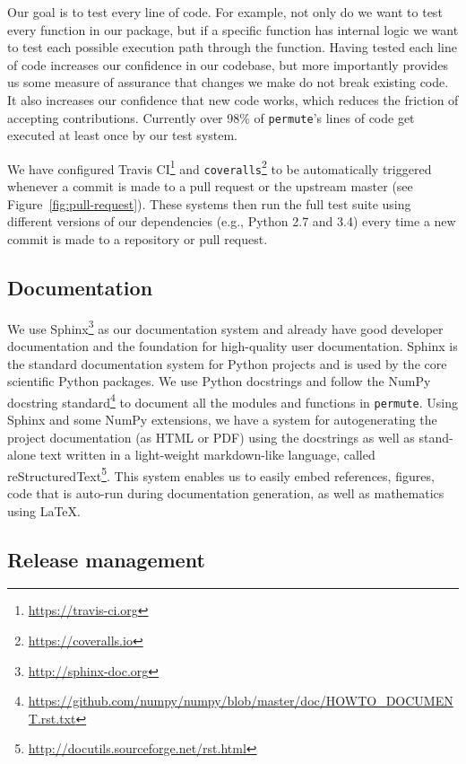 \documentclass[]{article}
\begin{document}
Our goal is to test every line of code.
For example, not only do we want to test every function in our package, but if
a specific function has internal logic we want to test each possible execution
path through the function.
Having tested each line of code increases our confidence in our codebase, but
more importantly provides us some measure of assurance that changes we make do
not break existing code.
It also increases our confidence that new code works, which reduces the
friction of accepting contributions.
Currently over 98\% of \texttt{permute}'s lines of code get executed at least
once by our test system.

We have configured Travis CI\footnote{\url{https://travis-ci.org}} and
\texttt{coveralls}\footnote{\url{https://coveralls.io}} to be automatically
triggered whenever a commit is made to a pull request or the upstream master
(see Figure~\ref{fig:pull-request}).
These systems then run the full test suite  using different versions of our
dependencies (e.g., Python 2.7 and 3.4) every time a new commit is made to a
repository or pull request.

\subsection{\label{sec:doc}Documentation}

We use Sphinx\footnote{\url{http://sphinx-doc.org}} as our documentation system
and already have good developer documentation and the foundation for
high-quality user documentation.
Sphinx is the standard documentation system for Python projects and is used by
the core scientific Python packages.
We use Python docstrings and follow the NumPy docstring
standard\footnote{\url{https://github.com/numpy/numpy/blob/master/doc/HOWTO\_DOCUMENT.rst.txt}}
to document all the modules and functions in \texttt{permute}.
Using Sphinx and some NumPy extensions, we have a system for autogenerating the
project documentation (as HTML or PDF) using the docstrings as well as
stand-alone text written in a light-weight markdown-like language, called
reStructuredText\footnote{\url{http://docutils.sourceforge.net/rst.html}}.
This system enables us to easily embed references, figures, code that is
auto-run during documentation generation, as well as mathematics using \LaTeX.

\subsection{\label{sec:release}Release management}
\end{document}
